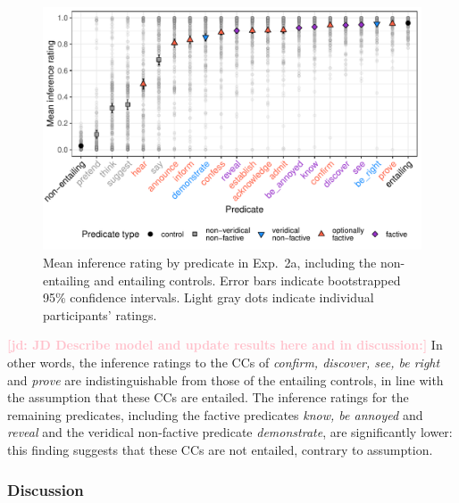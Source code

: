\documentclass[11pt,fleqn]{article}
\newcommand{\jd}[1]{\textbf{\textcolor{Pink}{[jd: #1]}}}
\newcommand{\6}{\mbox{$[\hspace*{-.6mm}[$}}
\newcommand{\9}{\mbox{$]\hspace*{-.6mm}]$}}
\begin{document}
\begin{figure}[h!]
\centering

\includegraphics[width=.7\paperwidth]{../../results/4-veridicality3/graphs/means-inference-by-predicate-variability}

\caption{Mean inference rating by predicate in Exp.~2a, including the non-entailing and entailing controls. Error bars indicate bootstrapped 95\% confidence intervals. Light gray dots indicate individual participants' ratings.} 
\label{f-veridicality-predicate}
\end{figure}

\jd{JD Describe model and update results here and in discussion:} In other words, the inference ratings to the CCs of {\em confirm, discover, see, be right} and {\em prove} are indistinguishable from those of the entailing controls, in line with the assumption that these CCs are entailed. The inference ratings for the remaining predicates, including the factive predicates {\em know, be annoyed} and {\em reveal} and the veridical non-factive predicate {\em demonstrate}, are significantly lower: this finding suggests that these CCs are not entailed, contrary to assumption. 

\subsubsection{Discussion}
\end{document}
